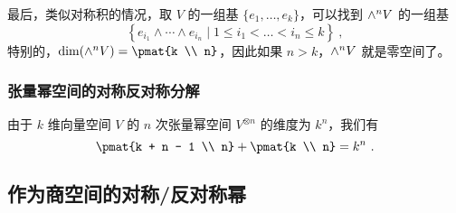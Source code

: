 最后，类似对称积的情况，取 $V$ 的一组基 $\{e_1, \dots, e_k\}$，可以找到 ${\large \wedge}^n V$ 的一组基
\begin{equation}
\left\{ e_{i_1} \wedge \cdots \wedge e_{i_n} \mid 1 \leq i_1 < \dots < i_n \leq k \right\}~,
\end{equation}
特别的，$\dim({\large \wedge}^n V) = \pmat{k \\ n}$，因此如果 $n > k$，${\large \wedge}^n V$ 就是零空间了。

\subsubsection{张量幂空间的对称反对称分解}




由于 $k$ 维向量空间 $V$ 的 $n$ 次张量幂空间 $V^{\otimes n}$ 的维度为 $k^n$，我们有
\begin{equation}
\pmat{k + n - 1 \\ n} + \pmat{k \\ n} = k^n~.
\end{equation}


\subsection{作为商空间的对称/反对称幂}